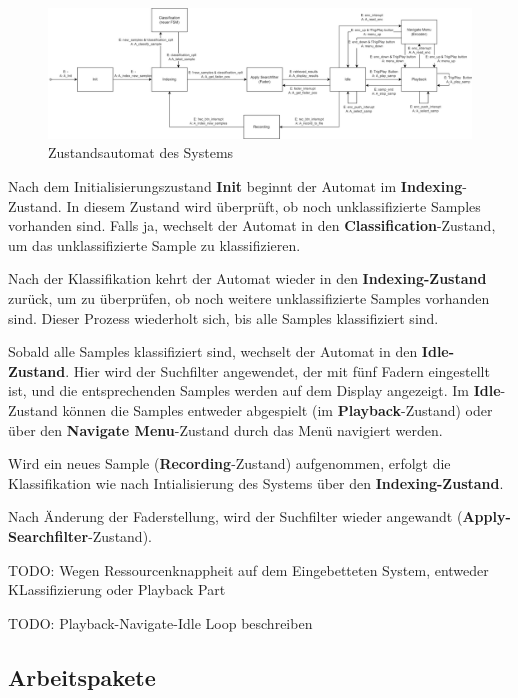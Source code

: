 \begin{figure}[H]
   	\centering
   	\includegraphics[width=1.0\textwidth]{images/04_spezifikation/fsm.drawio.png}
   	\caption{Zustandsautomat des Systems}
   	\label{fig:fsm}
\end{figure}

Nach dem Initialisierungszustand \textbf{Init} beginnt der Automat im \textbf{Indexing}-Zustand. In diesem Zustand wird überprüft, ob noch unklassifizierte Samples vorhanden sind. Falls ja, wechselt der Automat in den \textbf{Classification}-Zustand, um das unklassifizierte Sample zu klassifizieren. 

Nach der Klassifikation kehrt der Automat wieder in den \textbf{Indexing-Zustand} zurück, um zu überprüfen, ob noch weitere unklassifizierte Samples vorhanden sind. Dieser Prozess wiederholt sich, bis alle Samples klassifiziert sind.

Sobald alle Samples klassifiziert sind, wechselt der Automat in den \textbf{Idle-Zustand}. Hier wird der Suchfilter angewendet, der mit fünf Fadern eingestellt ist, und die entsprechenden Samples werden auf dem Display angezeigt. Im \textbf{Idle}-Zustand können die Samples entweder abgespielt (im \textbf{Playback}-Zustand) oder über den \textbf{Navigate Menu}-Zustand durch das Menü navigiert werden.

Wird ein neues Sample (\textbf{Recording}-Zustand) aufgenommen, erfolgt die Klassifikation wie nach Intialisierung des Systems über den \textbf{Indexing-Zustand}.

Nach Änderung der Faderstellung, wird der Suchfilter wieder angewandt (\textbf{Apply-Searchfilter}-Zustand).

TODO: Wegen Ressourcenknappheit auf dem Eingebetteten System, entweder KLassifizierung oder Playback Part

TODO: Playback-Navigate-Idle Loop beschreiben

\subsection{Arbeitspakete}

